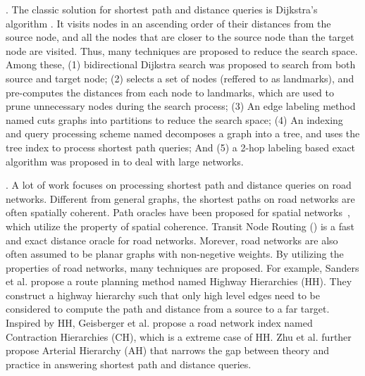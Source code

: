 .
The classic solution for shortest path and distance queries is Dijkstra's algorithm \cite{Dijkstra59}. It visits nodes in an ascending order of their distances from the source node, and all the nodes that are closer to the source node than the target node are visited. Thus, many techniques are proposed to reduce the search space. Among these, (1) bidirectional Dijkstra search \cite{LubyR89} was proposed to search from both source and target node; (2) \alt \cite{GoldbergH05} selects a set of nodes (reffered to as landmarks), and pre-computes the distances from each node to landmarks, which are used to prune unnecessary nodes during the search process; (3) An edge labeling method named \arcflag \cite{MohringSSWW05} cuts graphs into partitions to reduce the search space;
(4) An indexing and query processing scheme named \tedi \cite{Wei10} decomposes a graph into a tree, and uses the tree index to process shortest path queries; And (5) a 2-hop labeling based exact algorithm was proposed in \cite{delling2014robust} to deal with large networks.





.
 A lot of work focuses on processing shortest path and distance queries on road networks. Different from general graphs, the shortest paths on road networks are often spatially coherent. Path oracles have been proposed for spatial networks~\cite{SankaranarayananSA09}, which utilize the property of spatial coherence. Transit Node Routing (\tnr) \cite{arz2013transit} is a fast and exact distance oracle for road networks. Morever, road networks are also often assumed to be planar graphs with non-negetive weights\cite{fakcharoenphol2006planar,gupta2004roads,klein2010shortest,MozesS12}. By utilizing the properties of road networks, many techniques\cite{SandersS05, GeisbergerSSD08, zhu2013shortest} are proposed. For example, Sanders et al. propose a route planning method named Highway Hierarchies (HH)\cite{SandersS05}. They construct a highway hierarchy such that only high level edges need to be considered to compute the path and distance from a source to a far target. Inspired by HH, Geisberger et al.\cite{GeisbergerSSD08} propose a road network index named Contraction Hierarchies (CH), which is a extreme case of HH. Zhu et al. further propose Arterial Hierarchy (AH)\cite{zhu2013shortest} that narrows the gap between theory and practice in answering shortest path and distance queries.

